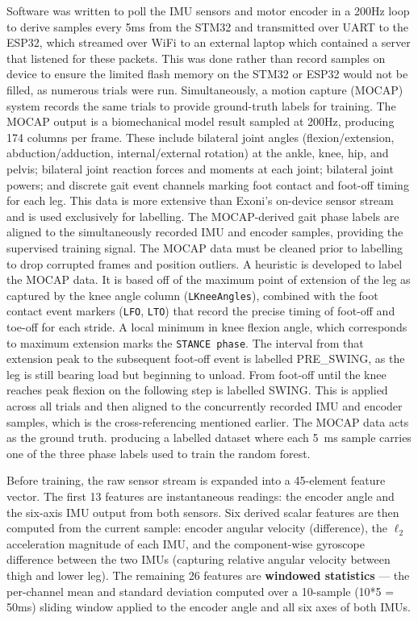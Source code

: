 \documentclass[11pt]{article}
\begin{document}
\vspace{10px}
Software was written to poll the IMU sensors and motor encoder in a 200Hz loop to derive samples every 5ms from the STM32 and transmitted over 
UART to the ESP32, which streamed over WiFi to an external laptop which contained a server that listened for these packets. This was done rather 
than record samples on device to ensure the limited flash memory on the STM32 or ESP32 would not be filled, as numerous trials were run. 
Simultaneously, a motion capture (MOCAP) system records the same trials to provide ground-truth labels for training. The MOCAP output is a biomechanical model result sampled at 200Hz, producing 174 columns per frame. These include bilateral joint angles (flexion/extension, abduction/adduction, internal/external rotation) at the ankle, knee, hip, and pelvis; bilateral joint reaction forces and moments at each joint; bilateral joint powers; and discrete gait event channels marking foot contact and foot-off timing for each leg. 
This data is more extensive than Exoni's on-device sensor stream and is used exclusively for labelling. 
The MOCAP-derived gait phase labels are aligned to the simultaneously recorded IMU and encoder samples, providing the supervised training signal. 
The MOCAP data must be cleaned prior to labelling to drop corrupted frames and position outliers. 
A heuristic is developed to label the MOCAP data. 
It is based off of the maximum point of extension of the leg as captured by the knee angle column (\texttt{LKneeAngles}), 
combined with the foot contact event markers (\texttt{LFO}, \texttt{LTO}) that record the precise timing of foot-off and toe-off for each stride. 
A local minimum in knee flexion angle, which corresponds to maximum extension marks the \verb|STANCE phase|. 
The interval from that extension peak to the subsequent foot-off event is labelled PRE\_SWING, as the leg is still bearing load but beginning to unload. 
From foot-off until the knee reaches peak flexion on the following step is labelled SWING. 
This is applied across all trials and then aligned to the concurrently recorded IMU and encoder samples, which 
is the cross-referencing mentioned earlier. The MOCAP data acts as the ground truth.
producing a labelled dataset where each 5~ms sample carries one of the three phase labels used to train the random forest.

\vspace{10px}

Before training, the raw sensor stream is expanded into a 45-element feature vector. The first 13 features are instantaneous readings: the encoder angle and the six-axis IMU output from both sensors. Six derived scalar features are then computed from the current sample: encoder angular velocity (difference), the $\ell_2$ acceleration magnitude of each IMU, and the component-wise gyroscope difference between the two IMUs (capturing relative angular velocity between thigh and lower leg). The remaining 26 features are \textbf{windowed statistics} — the per-channel mean and standard deviation computed over a 10-sample (10*5 = 50ms) sliding window applied to the encoder angle and all six axes of both IMUs.
\end{document}
